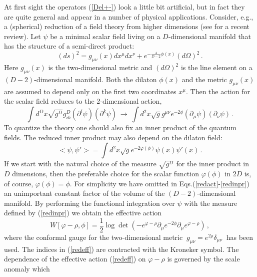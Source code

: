 \documentclass[a4paper,12pt]{article}
\begin{document}
At first sight the operators (\ref{Del+-}) look a little bit
artificial, but in fact they are quite general and 
appear in a number of physical applications. 
Consider, e.g., a (spherical) reduction of a field theory
from higher dimensions (see \cite{Kummer:1999zy} for a
recent review). Let $\psi$ be a minimal scalar field living on 
a $D$-dimensional manifold that has the structure of a 
semi-direct product:
\begin{equation}
(ds)^2=g_{\mu\nu}(x)dx^\mu dx^\nu + e^{-\frac 4{D-2} \phi (x)}
(d\Omega )^2 \,.\label{line}
\end{equation}
Here $g_{\mu\nu}(x)$ is the two-dimensional metric and
$(d\Omega )^2$ is the line element on a $(D-2)$-dimensional
manifold. Both the dilaton $\phi(x)$ and the metric $g_{\mu\nu}(x)$
are assumed to depend only on the first two coordinates $x^{\mu}$. 
Then the action for the scalar field reduces to the 2-dimensional 
action,
\begin{equation}
\int d^Dx\sqrt{g^D} g^D_{ik}(\partial^i\psi )(\partial^k\psi)
\ \to \ \int d^2x \sqrt{g} g^{\mu\nu} e^{-2\phi}
 (\partial_\mu\psi) (\partial_\nu \psi )\,.
\label{redact}
\end{equation}
To quantize the theory one should also fix an inner product
of the quantum fields. 
The reduced inner product may also depend on the dilaton
field:
\begin{equation}
<\psi ,\psi' >=\int d^2x \sqrt{g}e^{-2\varphi(\phi)}
\psi (x) \psi'(x) \,. \label{redinpr}
\end{equation} 
If we start with the natural choice of the measure $\sqrt{g^D}$
for the inner product in $D$ dimensions, then the 
preferable choice for the scalar function $\varphi (\phi )$ in $2D$
is, of course, $\varphi (\phi )=\phi$. For simplicity  
we have omitted in Eqs.(\ref{redact}-\ref{redinpr}) 
an unimportant constant factor of
the volume of the $(D-2)$-dimensional manifold.
By performing the 
functional integration over $\psi$ with the measure defined
by (\ref{redinpr}) we obtain the effective action
\begin{equation}
W[\varphi -\rho ,\phi ]
=\frac 12 \log \det (-e^{\varphi -\rho }
\partial_\mu e^{-2\phi} \partial_\mu e^{\varphi -\rho } )\,,
\label{redeff}
\end{equation}
where the conformal gauge for the two-dimensional metric 
$~g_{\mu\nu}=e^{2\rho}\delta_{\mu\nu}~$ 
has been used. The indices
in (\ref{redeff}) are contracted with the Kroneker symbol.
The dependence of the effective action (\ref{redeff}) on 
$\varphi -\rho$ is governed by the scale anomaly which
\end{document}
